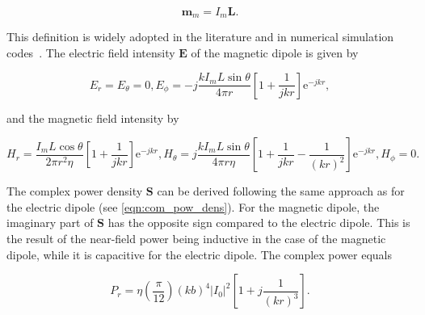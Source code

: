 \begin{equation}
	\mathbf{m}_m = I_m \mathbf{L}.
	\label{eqn:mag_dipole_moment}
\end{equation}

This definition is widely adopted in the literature and in numerical simulation
codes~\cite{Kreindl_Bauernfeind_Weiss_Stockreiter_Kaltenbacher_2024}. The electric field intensity $\mathbf{E}$ of the magnetic dipole
is given by

\begin{subequations}\label{eqn:m_e}
	\begin{equation}
		E_r=E_\theta=0,
		\label{eqn:m_ert}
	\end{equation}
	\begin{equation}
		E_\phi = -j\frac{k I_m L \sin\theta}{4\pi r}\left[1 + \frac{1}{jkr}\right]\mathrm{e}^{-jkr},
		\label{eqn:m_ep}
	\end{equation}
\end{subequations}

and the magnetic field intensity by \cite[p.~237]{Balanis_1997}

\begin{subequations}\label{eqn:m_h}
	\begin{equation}
		H_r =  \frac{I_m L \cos \theta}{2\pi r^2\eta}\left[ 1 + \frac{1}{jkr} \right] \mathrm{e}^{-jkr},
		\label{eqn:m_hr}
	\end{equation}
	\begin{equation}
		H_\theta = j \frac{kI_m L \sin \theta }{4\pi r\eta}\left[ 1 + \frac{1}{jkr} - \frac{1}{(kr)^2} \right] \mathrm{e}^{-jkr},
		\label{eqn:m_ht}
	\end{equation}
	\begin{equation}
		H_\phi = 0.
		\label{eqn:m_hp}
	\end{equation}
\end{subequations}

The complex power density $\mathbf{S}$ can be derived following the same approach as for the electric dipole (see \eqref{eqn:com_pow_dens}). For the magnetic dipole, the imaginary part of $\mathbf{S}$ has the opposite sign compared to the electric dipole. This is the result of the near-field power being inductive in the case of the magnetic dipole, while it is capacitive for the electric dipole. The complex power equals \cite[p.~238]{Balanis_1997}


\begin{equation}
P_r = \eta \left(\frac{\pi}{12}\right) (kb)^4 |I_0|^2 \left[1 + j\frac{1}{(kr)^3}\right].
\label{eqn:pr_loop}
\end{equation}




